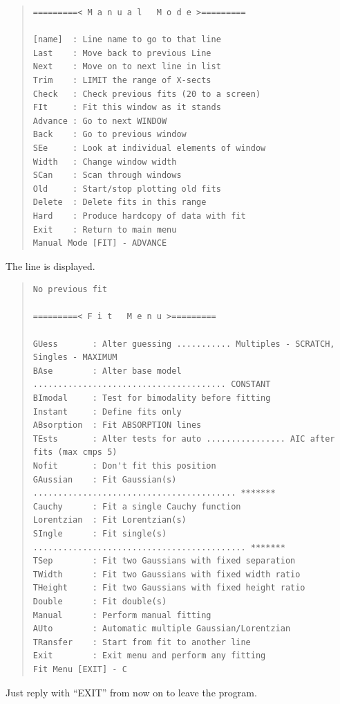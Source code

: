 \begin{quote}
\begin{small}
\begin{verbatim}
=========< M a n u a l   M o d e >=========
 
[name]  : Line name to go to that line
Last    : Move back to previous Line
Next    : Move on to next line in list
Trim    : LIMIT the range of X-sects
Check   : Check previous fits (20 to a screen)
FIt     : Fit this window as it stands
Advance : Go to next WINDOW
Back    : Go to previous window
SEe     : Look at individual elements of window
Width   : Change window width
SCan    : Scan through windows
Old     : Start/stop plotting old fits
Delete  : Delete fits in this range
Hard    : Produce hardcopy of data with fit
Exit    : Return to main menu
Manual Mode [FIT] - ADVANCE
\end{verbatim}\end{small}\end{quote}

The line is displayed.

\begin{quote}\begin{small}\begin{verbatim}
No previous fit
 
=========< F i t   M e n u >=========
 
GUess       : Alter guessing ........... Multiples - SCRATCH, Singles - MAXIMUM
BAse        : Alter base model ....................................... CONSTANT
BImodal     : Test for bimodality before fitting
Instant     : Define fits only
ABsorption  : Fit ABSORPTION lines
TEsts       : Alter tests for auto ................ AIC after fits (max cmps 5)
Nofit       : Don't fit this position
GAussian    : Fit Gaussian(s) ......................................... *******
Cauchy      : Fit a single Cauchy function
Lorentzian  : Fit Lorentzian(s)
SIngle      : Fit single(s) ........................................... *******
TSep        : Fit two Gaussians with fixed separation
TWidth      : Fit two Gaussians with fixed width ratio
THeight     : Fit two Gaussians with fixed height ratio
Double      : Fit double(s)
Manual      : Perform manual fitting
AUto        : Automatic multiple Gaussian/Lorentzian
TRansfer    : Start from fit to another line
Exit        : Exit menu and perform any fitting
Fit Menu [EXIT] - C
\end{verbatim}\end{small}\end{quote}

Just reply with ``EXIT'' from now on to leave the program.

